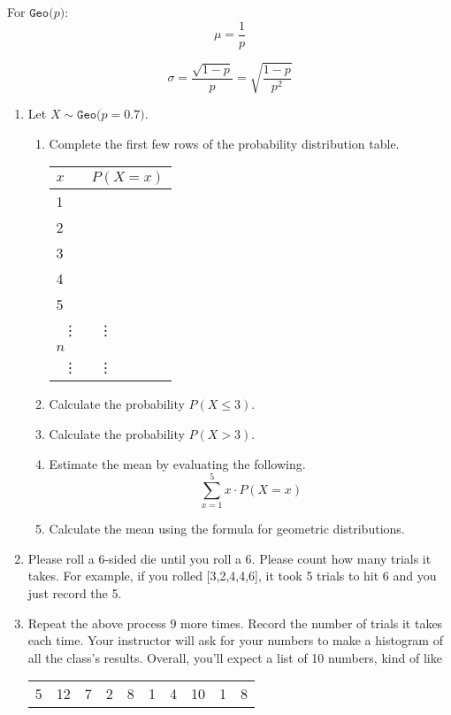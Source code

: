 \documentclass[12pt,letterpaper]{article}
\newcommand{\Geo}[1]{\texttt{Geo}\big(#1\big)}
\begin{document}
For $\Geo{p}$:
$$\mu = \frac{1}{p}$$

$$\sigma= \frac{\sqrt{1-p}}{p} = \sqrt{\frac{1-p}{p^2}}$$

\newpage

\begin{enumerate}
\item Let $X\sim \Geo{p=0.7}$. 
\begin{enumerate}
\item Complete the first few rows of the probability distribution table.
\begin{center}
\def\arraystretch{1.3}
\Large
\begin{tabularx}{0.4\textwidth}{|Y|Y|}\hline
$x$ & $P(X=x)$ \\  & \\
2 & \\
3 & \\
4 & \\
5 & \\
~\vdots & ~\vdots \\
$n$ & \\
~\vdots & ~\vdots \\ \hline
\end{tabularx}
\end{center}
\item Calculate the probability $P(X\le3)$.
\vfill
\item Calculate the probability $P(X>3)$.
\vfill
\item Estimate the mean by evaluating the following.
$$\sum_{x=1}^5 x \cdot P(X=x) $$ 
\vfill
\item Calculate the mean using the formula for geometric distributions.
\vfill
\end{enumerate}

\newpage
\item Please roll a 6-sided die until you roll a 6. Please count how many trials it takes. For example, if you rolled [3,2,4,4,6], it took 5 trials to hit 6 and you just record the 5.
\vfill
\item Repeat the above process 9 more times. Record the number of trials it takes each time. Your instructor will ask for your numbers to make a histogram of all the class's results. Overall, you'll expect a list of 10 numbers, kind of like 
\begin{center}
\begin{tabular}{cccccccccc}
5 & 12 & 7 & 2 & 8 & 1 & 4 & 10 & 1 & 8 
\end{tabular}
\end{center}


\end{enumerate}
\end{document}
